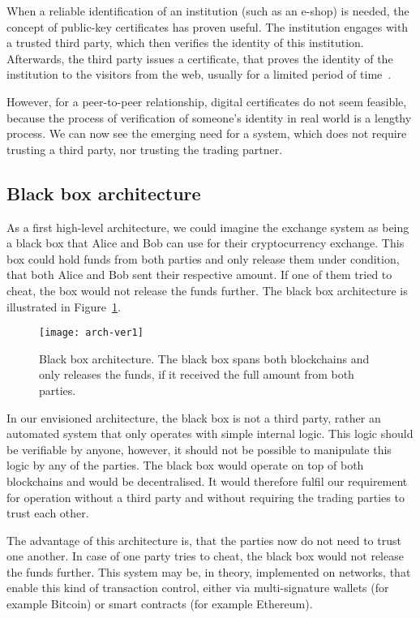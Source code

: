 When a reliable identification of an institution (such as an e-shop) is needed, the concept of public-key certificates has proven useful. The institution engages with a trusted third party, which then verifies the identity of this institution. Afterwards, the third party issues a certificate, that proves the identity of the institution to the visitors from the web, usually for a limited period of time~\cite{Lee2013SecurityArchitects}. 

However, for a peer-to-peer relationship, digital certificates do not seem feasible, because the process of verification of someone's identity in real world is a lengthy process. We can now see the emerging need for a system, which does not require trusting a third party, nor trusting the trading partner. 

\subsection{Black box architecture}
As a first high-level architecture, we could imagine the exchange system as being a black box that Alice and Bob can use for their cryptocurrency exchange. This box could hold funds from both parties and only release them under condition, that both Alice and Bob sent their respective amount. If one of them tried to cheat, the box would not release the funds further. The black box architecture is illustrated in Figure~\ref{fig:arch-ver1}.
% 
\begin{figure}[ht]
    \centering
    \texttt{[image: arch-ver1]}
    \caption{Black box architecture. The black box spans both blockchains and only releases the funds, if it received the full amount from both parties.}
    \label{fig:arch-ver1}
\end{figure}

In our envisioned architecture, the black box is not a third party, rather an automated system that only operates with simple internal logic. This logic should be verifiable by anyone, however, it should not be possible to manipulate this logic by any of the parties. The black box would operate on top of both blockchains and would be decentralised. It would therefore fulfil our requirement for operation without a third party and without requiring the trading parties to trust each other.

The advantage of this architecture is, that the parties now do not need to trust one another. In case of one party tries to cheat, the black box would not release the funds further. This system may be, in theory, implemented on networks, that enable this kind of transaction control, either via multi-signature wallets (for example Bitcoin) or smart contracts (for example Ethereum).

